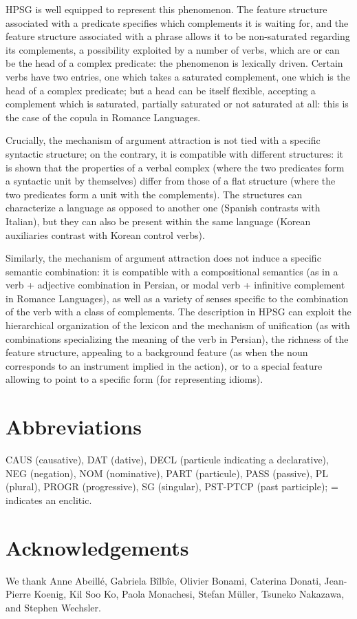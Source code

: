 \documentclass[output=paper]{langsci/langscibook}
\begin{document}
{HPSG is well equipped to represent this phenomenon. The feature structure associated with a predicate specifies which complements it is waiting for, and the feature structure associated with a phrase allows it to be non-saturated regarding its complements, a possibility exploited by a number of verbs, which are or can be the head of a complex predicate: the phenomenon is lexically driven. Certain verbs have two entries, one which takes a saturated complement, one which is the head of a complex predicate; but a head can be itself flexible, accepting a complement which is saturated, partially saturated or not saturated at all: this is the case of the copula in Romance Languages.

Crucially, the mechanism of argument attraction is not tied with a specific syntactic structure; on the contrary, it is compatible with different structures: it is shown that the properties of a verbal complex (where the two predicates form a syntactic unit by themselves) differ from those of a flat structure (where the two predicates form a unit with the complements). The structures can characterize a language as opposed to another one (Spanish contrasts with Italian), but they can also be present within the same language (Korean auxiliaries contrast with Korean control verbs).

Similarly, the mechanism of argument attraction does not induce a specific semantic combination: it is compatible with a compositional semantics (as in a verb + adjective combination in Persian, or modal verb + infinitive complement in Romance Languages), as well as a variety of senses specific to the combination of the verb with a class of complements. The description in HPSG can exploit the hierarchical organization of the lexicon and the mechanism of unification (as with combinations specializing the meaning of the verb in Persian), the richness of the feature structure, appealing to a background feature (as when the noun corresponds to an instrument implied in the action), or to a special feature allowing to point to a specific form (for representing idioms).    

} %

\section*{Abbreviations}

CAUS (causative), DAT (dative), DECL (particule indicating a declarative), 
NEG (negation), NOM (nominative), PART (particule), PASS (passive), PL (plural), PROGR
(progressive), SG (singular), PST-PTCP (past participle); = indicates an enclitic.

\section*{Acknowledgements}

We thank Anne Abeill\'e, Gabriela B\^ilb\^ie, Olivier Bonami, Caterina Donati,
  Jean-Pierre Koenig, Kil Soo Ko, Paola Monachesi, Stefan Müller, Tsuneko Nakazawa, and Stephen
  Wechsler. 

{\sloppy
	\printbibliography[heading=subbibliography,notkeyword=this]
}
\end{document}
